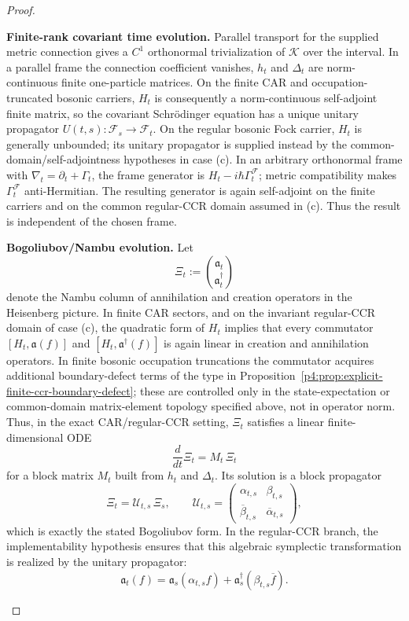 \documentclass[12pt,a4paper]{article}
\begin{document}
\begin{proof}
\begin{proofsteps}

\item \textbf{Finite-rank covariant time evolution.}
Parallel transport for the supplied metric connection gives a \(C^1\)
orthonormal trivialization of \(\mathcal K\) over the interval.  In a
parallel frame the connection coefficient vanishes, \(h_t\) and \(\Delta_t\)
are norm-continuous finite one-particle matrices.  On the finite CAR and
occupation-truncated bosonic carriers, \(H_t\) is consequently a
norm-continuous self-adjoint finite matrix, so the covariant Schr\"odinger
equation has a unique unitary propagator
\(U(t,s):\mathcal F_s\to\mathcal F_t\).  On the regular bosonic Fock carrier,
\(H_t\) is generally unbounded; its unitary propagator is supplied instead by
the common-domain/self-adjointness hypotheses in case (c).
In an arbitrary orthonormal frame
with \(\nabla_t=\partial_t+\Gamma_t\), the frame generator is
\(H_t-i\hbar\Gamma_t^{\mathcal F}\); metric compatibility makes
\(\Gamma_t^{\mathcal F}\) anti-Hermitian.  The resulting generator is again
self-adjoint on the finite carriers and on the common regular-CCR domain
assumed in (c).  Thus the result is independent of the chosen frame.


\item \textbf{Bogoliubov/Nambu evolution.}
Let
\[
\Xi_t:=\binom{\mathfrak a_t}{\mathfrak a_t^\dagger}
\]
denote the Nambu column of annihilation and creation operators in the Heisenberg picture.
In finite CAR sectors, and on the invariant regular-CCR domain of case (c),
the quadratic form of \(H_t\) implies that every commutator
\([H_t,\mathfrak a(f)]\) and
\([H_t,\mathfrak a^\dagger(f)]\) is again linear in creation and
annihilation operators.  In finite bosonic occupation truncations the
commutator acquires additional boundary-defect terms of the type in
Proposition~\ref{p4:prop:explicit-finite-ccr-boundary-defect}; these are
controlled only in the state-expectation or common-domain matrix-element
topology specified above, not in operator norm.
Thus, in the exact CAR/regular-CCR setting, \(\Xi_t\) satisfies a linear finite-dimensional ODE
\[
\frac{d}{dt}\Xi_t = M_t\,\Xi_t
\]
for a block matrix \(M_t\) built from \(h_t\) and \(\Delta_t\).
Its solution is a block propagator
\[
\Xi_t = \mathcal U_{t,s}\,\Xi_s,
\qquad
\mathcal U_{t,s}=
\begin{pmatrix}
\alpha_{t,s} & \beta_{t,s}\\
\overline{\beta}_{t,s} & \overline{\alpha}_{t,s}
\end{pmatrix},
\]
which is exactly the stated Bogoliubov form.  In the regular-CCR branch, the
implementability hypothesis ensures that this algebraic symplectic
transformation is realized by the unitary propagator:
\[
\mathfrak a_t(f)=\mathfrak a_s(\alpha_{t,s}f)+\mathfrak a_s^\dagger(\beta_{t,s}\overline f).
\]


\end{proofsteps}
\end{proof}
\end{document}
